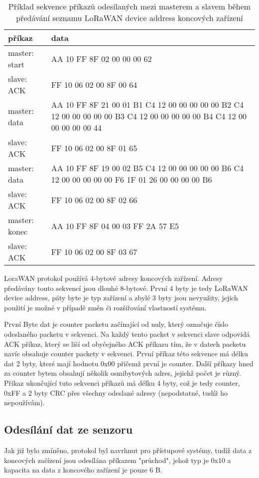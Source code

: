 \begin{table}[!h]
    \begin{tabular}{ |l|p{10cm}| }
    \hline
    příkaz      &  data    \\ \hline \hline
    master: start      &  AA 10 FF 8F 02 00 00 00 62    \\ \hline
    slave: ACK        &  FF 10 06 02 00 8F 00 64    \\ \hline
    master: data     &  AA 10 FF 8F 21 00 01 B1 C4 12 00 00 00 00 00 B2 C4 12 00 00 00 00 00 B3 C4 12 00 00 00 00 00 B4 C4 12 00 00 00 00 00 44 \\ \hline
    slave: ACK      &  FF 10 06 02 00 8F 01 65   \\ \hline
    master: data     &  AA 10 FF 8F 19 00 02 B5 C4 12 00 00 00 00 00 B6 C4 12 00 00 00 00 00 F6 1F 01 26 00 00 00 00 B6 \\ \hline
    slave: ACK      &   FF 10 06 02 00 8F 02 66   \\ \hline
    master: konec   &   AA 10 FF 8F 04 00 03 FF 2A 57 E5   \\ \hline
    slave: ACK      &   FF 10 06 02 00 8F 03 67  \\ \hline
    \end{tabular}
    \caption{Příklad sekvence příkazů odesílaných mezi masterem a slavem během předávání seznamu LoRaWAN device address koncových zařízení}
    \label{table:2}
\end{table}

LoraWAN protokol používá 4-bytové adresy koncových zařízení.
Adresy předávány touto sekvencí jsou dlouhé 8-bytové. První 4 byty je tedy LoRaWAN device address, páty byte je typ zařízení a zbylé 3 byty jsou nevyužity, jejich použití je možné v případě změn či rozšiřování vlastností systému. 

První Byte dat je counter packetu začínající od nuly, který označuje číslo odeslaného packetu v sekvenci. Na každý tento packet v sekvenci slave odpovídá ACK příkaz, který se liší od obyčejného ACK příkazu tím, že v datech packetu navíc obsahuje counter packety v sekvenci.
První příkaz této sekvence má délku dat 2 byty, které mají hodnotu 0x00 přičemž první je counter.
Další příkazy hned za counter bytem obsahují několik osmibytových adres, jejichž počet je různý.
Příkaz ukončující tuto sekvenci příkazů má délku 4 byty, což je tedy counter, 0xFF a 2 byty CRC přes všechny odeslané adresy (nepodstatné, tudíž ho nepoužívám).

\subsection{Odesílání dat ze senzoru}
Jak již bylo zmíněno, protokol byl navrhnut pro přístupové systémy, tudíž data z koncových začízení jsou odesílána příkazem "průchod", jehož typ je 0x10 a kapacita na data z koncového zařízení je pouze 6 B. 

